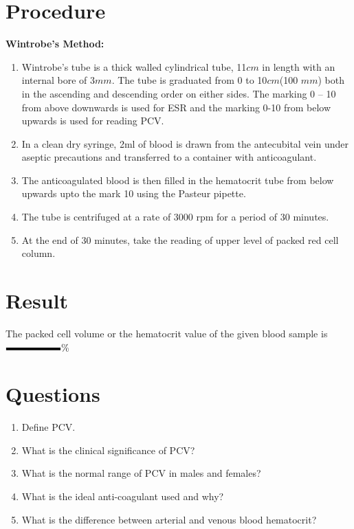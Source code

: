 \documentclass[a4paper,12pt]{book}
\begin{document}
													\section*{Procedure}
													\textbf{Wintrobe's Method:}\newline
													\begin{enumerate}
														\item{Wintrobe’s tube is a thick walled cylindrical tube, 11$cm$ in length with an internal bore of 3$mm$. The tube is graduated from 0 to 10$cm$(100 $mm$) both in the ascending and descending order on either sides. The marking 0 – 10 from above downwards is used for ESR and the marking 0-10 from below upwards is used for reading PCV.}
														\item{In a clean dry syringe, 2ml of blood is drawn from the antecubital vein under aseptic precautions and transferred to a container with anticoagulant.}
														\item{The anticoagulated blood is then filled in the hematocrit tube from below upwards upto the mark 10 using the Pasteur pipette.}
														\item{The tube is centrifuged at a rate of 3000 rpm for a period of 30 minutes.}
														\item{At the end of 30 minutes, take the reading of upper level of packed red cell column.}
													\end{enumerate}
													\section*{Result}
													The packed cell volume or the hematocrit value of the given blood sample is $\rule{2cm}{.1cm}$\%
													\section*{Questions}
													\begin{enumerate}
														\item{Define PCV.}
														\item{What is the clinical significance of PCV?}
														\item{What is the normal range of PCV in males and females?}
														\item{What is the ideal anti-coagulant used and why?}
														\item{What is the difference between arterial and venous blood hematocrit?}
													\end{enumerate}
\end{document}
